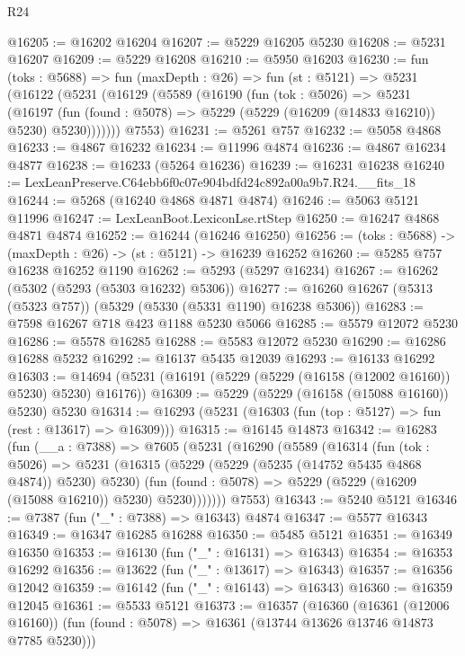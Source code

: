\begin{lexlean}{R24}
\begin{coremodule}
@16205 := @16202 @16204
@16207 := @5229 @16205 @5230
@16208 := @5231 @16207
@16209 := @5229 @16208
@16210 := @5950 @16203
@16230 := fun (toks : @5688) =>
  fun (maxDepth : @26) =>
  fun (st : @5121) =>
  @5231
    (@16122
      (@5231
        (@16129
          (@5589
            (@16190
              (fun (tok : @5026) =>
              @5231
                (@16197
                  (fun (found : @5078) => @5229 (@5229 (@16209 (@14833 @16210)) @5230) @5230)))))))
      @7553)
@16231 := @5261 @757
@16232 := @5058 @4868
@16233 := @4867 @16232
@16234 := @11996 @4874
@16236 := @4867 @16234 @4877
@16238 := @16233 (@5264 @16236)
@16239 := @16231 @16238
@16240 := LexLeanPreserve.C64ebb6f0c07e904bdfd24c892a00a9b7.R24.__fits_18
@16244 := @5268 (@16240 @4868 @4871 @4874)
@16246 := @5063 @5121 @11996
@16247 := LexLeanBoot.LexiconLse.rtStep
@16250 := @16247 @4868 @4871 @4874
@16252 := @16244 (@16246 @16250)
@16256 := (toks : @5688) -> (maxDepth : @26) -> (st : @5121) -> @16239 @16252
@16260 := @5285 @757 @16238 @16252 @1190
@16262 := @5293 (@5297 @16234)
@16267 := @16262 (@5302 (@5293 (@5303 @16232) @5306))
@16277 := @16260 @16267 (@5313 (@5323 @757)) (@5329 (@5330 (@5331 @1190) @16238 @5306))
@16283 := @7598 @16267 @718 @423 @1188 @5230 @5066
@16285 := @5579 @12072 @5230
@16286 := @5578 @16285
@16288 := @5583 @12072 @5230
@16290 := @16286 @16288 @5232
@16292 := @16137 @5435 @12039
@16293 := @16133 @16292
@16303 := @14694 (@5231 (@16191 (@5229 (@5229 (@16158 (@12002 @16160)) @5230) @5230) @16176))
@16309 := @5229 (@5229 (@16158 (@15088 @16160)) @5230) @5230
@16314 := @16293 (@5231 (@16303 (fun (top : @5127) => fun (rest : @13617) => @16309)))
@16315 := @16145 @14873
@16342 := @16283
    (fun (__a : @7388) =>
    @7605
      (@5231
        (@16290
          (@5589
            (@16314
              (fun (tok : @5026) =>
              @5231
                (@16315
                  (@5229 (@5229 (@5235 (@14752 @5435 @4868 @4874)) @5230) @5230)
                  (fun (found : @5078) => @5229 (@5229 (@16209 (@15088 @16210)) @5230) @5230)))))))
      @7553)
@16343 := @5240 @5121
@16346 := @7387 (fun ("_" : @7388) => @16343) @4874
@16347 := @5577 @16343
@16349 := @16347 @16285 @16288
@16350 := @5485 @5121
@16351 := @16349 @16350
@16353 := @16130 (fun ("_" : @16131) => @16343)
@16354 := @16353 @16292
@16356 := @13622 (fun ("_" : @13617) => @16343)
@16357 := @16356 @12042
@16359 := @16142 (fun ("_" : @16143) => @16343)
@16360 := @16359 @12045
@16361 := @5533 @5121
@16373 := @16357
    (@16360
      (@16361 (@12006 @16160))
      (fun (found : @5078) => @16361 (@13744 @13626 @13746 @14873 @7785 @5230)))

\end{coremodule}
\end{lexlean}
